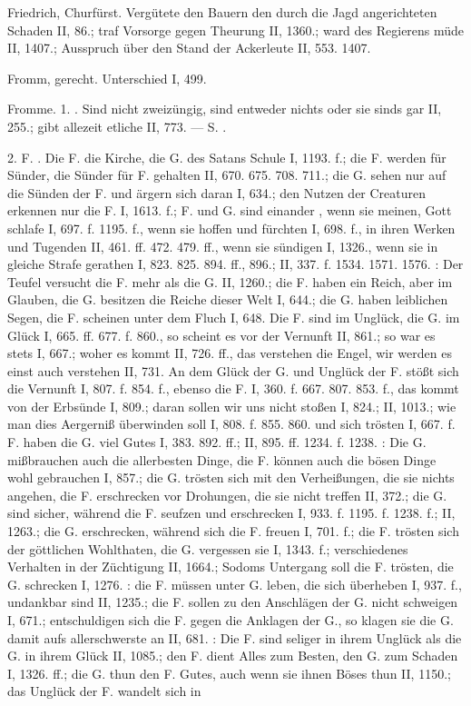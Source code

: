 Friedrich, Churfürst. Vergütete den Bauern den durch die Jagd angerichteten Schaden II, 86.; traf Vorsorge gegen Theurung II, 1360.; ward des Regierens müde II, 1407.; Ausspruch über den Stand der Ackerleute II, 553. 1407.

Fromm, gerecht. Unterschied I, 499.

Fromme. 1. . Sind nicht zweizüngig, sind entweder nichts oder sie sinds gar II, 255.; gibt allezeit etliche II, 773. — S. .

2. F. . Die F.  die Kirche, die G. des Satans Schule I, 1193. f.; die F. werden für Sünder, die Sünder für F. gehalten II, 670. 675. 708. 711.; die G. sehen nur auf die Sünden der F. und ärgern sich daran I, 634.; den Nutzen der Creaturen erkennen nur die F. I, 1613. f.; F. und G. sind einander , wenn sie meinen, Gott schlafe I, 697. f. 1195. f., wenn sie hoffen und fürchten I, 698. f., in ihren Werken und Tugenden II, 461. ff. 472. 479. ff., wenn sie sündigen I, 1326., wenn sie in gleiche Strafe gerathen I, 823. 825. 894. ff., 896.; II, 337. f. 1534. 1571. 1576. : Der Teufel versucht die F. mehr als die G. II, 1260.; die F. haben ein Reich, aber im Glauben, die G. besitzen die Reiche dieser Welt I, 644.; die G. haben leiblichen Segen, die F. scheinen unter dem Fluch I, 648. Die F. sind im Unglück, die G. im Glück I, 665. ff. 677. f. 860., so scheint es vor der Vernunft II, 861.; so war es stets I, 667.; woher es kommt II, 726. ff., das verstehen die Engel, wir werden es einst auch verstehen II, 731. An dem Glück der G. und Unglück der F. stößt sich die Vernunft I, 807. f. 854. f., ebenso die F. I, 360. f. 667. 807. 853. f., das kommt von der Erbsünde I, 809.; daran sollen wir uns nicht stoßen I, 824.; II, 1013.; wie man dies Aergerniß überwinden soll I, 808. f. 855. 860. und sich trösten I, 667. f.  F. haben die G. viel Gutes I, 383. 892. ff.; II, 895. ff. 1234. f. 1238. : Die G. mißbrauchen auch die allerbesten Dinge, die F. können auch die bösen Dinge wohl gebrauchen I, 857.; die G. trösten sich mit den Verheißungen, die sie nichts angehen, die F. erschrecken vor Drohungen, die sie nicht treffen II, 372.; die G. sind sicher, während die F. seufzen und erschrecken I, 933. f. 1195. f. 1238. f.; II, 1263.; die G. erschrecken, während sich die F. freuen I, 701. f.; die F. trösten sich der göttlichen Wohlthaten, die G. vergessen sie I, 1343. f.; verschiedenes Verhalten in der Züchtigung II, 1664.; Sodoms Untergang soll die F. trösten, die G. schrecken I, 1276. : die F. müssen unter G. leben, die sich überheben I, 937. f., undankbar sind II, 1235.; die F. sollen zu den Anschlägen der G. nicht schweigen I, 671.; entschuldigen sich die F. gegen die Anklagen der G., so klagen sie die G. damit aufs allerschwerste an II, 681. : Die F. sind seliger in ihrem Unglück als die G. in ihrem Glück II, 1085.; den F. dient Alles zum Besten, den G. zum Schaden I, 1326. ff.; die G. thun den F. Gutes, auch wenn sie ihnen Böses thun II, 1150.; das Unglück der F. wandelt sich in 